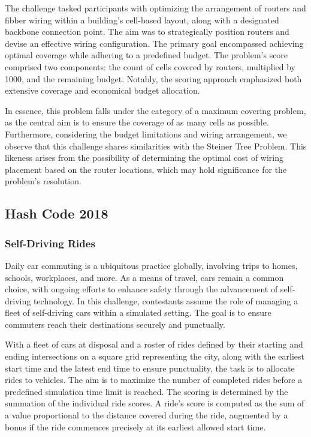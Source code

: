 The challenge tasked participants with optimizing the arrangement of routers and
fibber wiring within a building's cell-based layout, along with a designated
backbone connection point. The aim was to strategically position routers and
devise an effective wiring configuration. The primary goal encompassed achieving
optimal coverage while adhering to a predefined budget. The problem's score
comprised two components: the count of cells covered by routers, multiplied by
1000, and the remaining budget. Notably, the scoring approach emphasized both
extensive coverage and economical budget allocation.

In essence, this problem falls under the category of a maximum covering problem,
as the central aim is to ensure the coverage of as many cells as possible.
Furthermore, considering the budget limitations and wiring arrangement, we
observe that this challenge shares similarities with the Steiner Tree Problem.
This likeness arises from the possibility of determining the optimal cost of
wiring placement based on the router locations, which may hold significance for the
problem's resolution.

\subsection{Hash Code 2018}
\label{subsec:hashcode-2018}

\subsubsection*{Self-Driving Rides}
\label{subsubsec:hashcode-2018-qualification}

Daily car commuting is a ubiquitous practice globally, involving trips to homes,
schools, workplaces, and more. As a means of travel, cars remain a common
choice, with ongoing efforts to enhance safety through the advancement of
self-driving technology. In this challenge, contestants assume the role of
managing a fleet of self-driving cars within a simulated setting. The goal is to
ensure commuters reach their destinations securely and punctually.

With a fleet of cars at disposal and a roster of rides defined by their starting
and ending intersections on a square grid representing the city, along with the
earliest start time and the latest end time to ensure punctuality, the task is
to allocate rides to vehicles. The aim is to maximize the number of completed
rides before a predefined simulation time limit is reached. The scoring is
determined by the summation of the individual ride scores. A ride's score is
computed as the sum of a value proportional to the distance covered during the
ride, augmented by a bonus if the ride commences precisely at its earliest
allowed start time.

